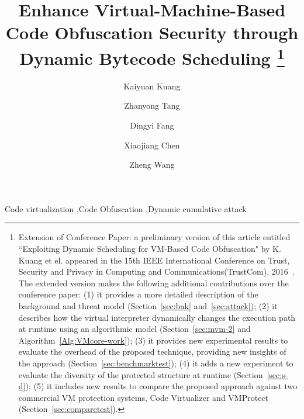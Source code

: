 \documentclass[preprint,12pt,3p]{elsarticle}
\begin{document}
\begin{frontmatter}

\title{
Enhance Virtual-Machine-Based Code Obfuscation Security through Dynamic Bytecode Scheduling
\footnote{
Extension of Conference Paper: a preliminary version of this article entitled ``Exploiting Dynamic Scheduling for VM-Based Code Obfuscation" by K. Kuang et el. appeared in the 15th IEEE International Conference on Trust, Security and
Privacy in Computing and Communications(TrustCom), 2016~\cite{kuang2016exploiting}. The extended version makes the following additional contributions over the conference paper: (1) it provides a more detailed description of the background and threat model (Section~\ref{sec:bak} and~\ref{sec:attack}); (2) it describes how the virtual interpreter dynamically changes the execution path at runtime using an algorithmic model (Section~\ref{sec:mvm-2} and Algorithm~\ref{Alg:VMcore-work}); (3) it provides new experimental results to evaluate the overhead of the proposed technique, providing new insights of the approach (Section~\ref{sec:benchmarktest}); (4) it adds a new experiment to evaluate the diversity of the protected structure at runtime (Section~\ref{sec:s-d}); (5) it includes new results to compare the proposed approach against two commercial VM protection systems, Code Virtualizer and VMProtect (Section~\ref{sec:comparetest}).
}
}

\author[label1]{Kaiyuan Kuang}
\address[label1]{School of Information Science and Technology, Northwest University, China.}
\address[label2]{School of Computing and Communications, Lancaster University, UK}%




\author[label1]{Zhanyong Tang}

\author[label1]{Dingyi Fang}

\author[label1]{Xiaojiang Chen}

\author[label2]{Zheng Wang}



\begin{keyword}
Code virtualization \sep Code Obfuscation \sep Dynamic cumulative attack
\end{keyword}

\end{frontmatter}
\end{document}
